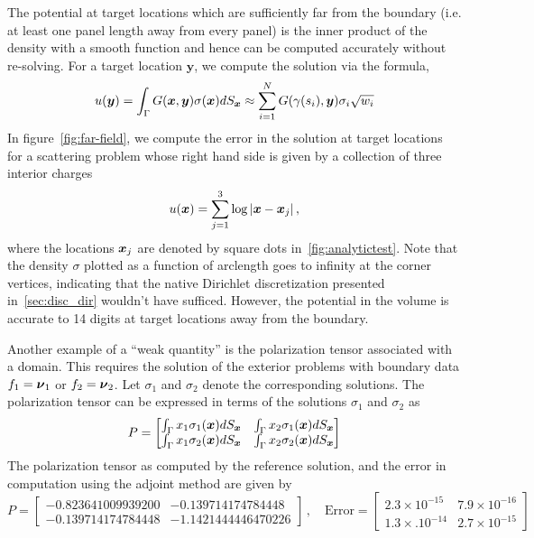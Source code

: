 The potential at target locations which are sufficiently far from the boundary (i.e. at least one panel length away from 
every panel) is the inner product of the 
density with a smooth function and hence can be computed accurately without re-solving. For a target 
location $\boldsymbol{y}$, we compute the solution via the formula,
\begin{equation}
u(\boldsymbol{y}) = \int_{\Gamma} G(\boldsymbol{x},\boldsymbol{y}) \sigma(\boldsymbol{x}) dS_{\boldsymbol{x}} \approx \sum_{i=1}^{N}  G(\gamma(s_{i}),\boldsymbol{y}) \sigma_{i} \sqrt{w_{i}}
\end{equation}
In figure~\cref{fig:far-field}, we compute the error in the solution at target
locations for a scattering problem whose right hand side is given by a collection of three interior charges
\begin{equation}
u(\boldsymbol{x}) = \sum_{j=1}^{3} \log |\boldsymbol{x} - \boldsymbol{x}_{j}| \, ,  
\end{equation}
where the locations $\boldsymbol{x}_{j}$ are denoted by square dots in~\cref{fig:analytictest}. Note that the density $\sigma$ plotted
as a function of arclength goes to infinity at the corner vertices, indicating that the native Dirichlet discretization 
presented in~\cref{sec:disc_dir} wouldn't have sufficed. However, the potential in the volume is accurate to 14 digits at
target locations away from the boundary. 

Another example of a ``weak quantity'' is the polarization tensor associated with a domain. This requires the solution of the
exterior problems with boundary data $f_{1} = \boldsymbol{\nu}_{1}$ or $f_{2} = \boldsymbol{\nu}_{2}$. Let $\sigma_{1}$ and $\sigma_{2}$ denote
the corresponding solutions. The polarization tensor can be expressed in terms of the solutions $\sigma_{1}$ and $\sigma_{2}$
as
\begin{equation}
P = \begin{bmatrix}
\int_{\Gamma} x_{1} \sigma_{1}(\boldsymbol{x}) dS_{\boldsymbol{x}} & \int_{\Gamma} x_{2} \sigma_{1}(\boldsymbol{x}) dS_{\boldsymbol{x}} \\
\int_{\Gamma} x_{1} \sigma_{2}(\boldsymbol{x}) dS_{\boldsymbol{x}} & \int_{\Gamma} x_{2} \sigma_{2}(\boldsymbol{x}) dS_{\boldsymbol{x}} 
\end{bmatrix}
\end{equation}
The polarization tensor as computed by the reference solution, and the error in computation using the adjoint method
are given by
\begin{equation}
P = \begin{bmatrix}
-0.823641009939200 & -0.139714174784448 \\
 -0.139714174784448 &  -1.1421444446470226
\end{bmatrix} \, , \quad \text{Error} = 
\begin{bmatrix} 
2.3 \times 10^{-15} & 7.9 \times 10^{-16} \\
1.3 \times. 10^{-14} & 2.7 \times 10^{-15}
\end{bmatrix}
\end{equation}

